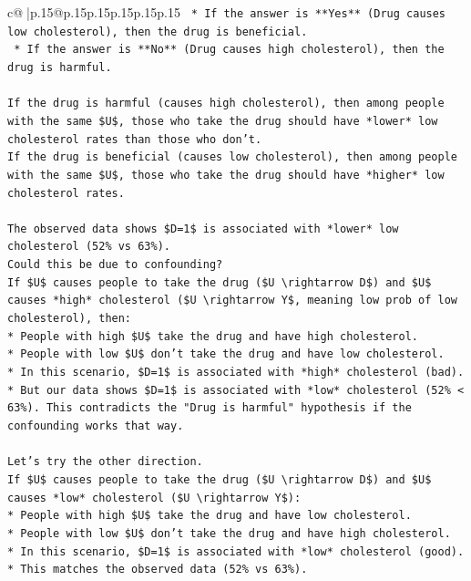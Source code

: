 \documentclass{article}
\begin{document}
{\begin{supertabular}{c@{$\;$}|p{.15\linewidth}@{}p{.15\linewidth}p{.15\linewidth}p{.15\linewidth}p{.15\linewidth}p{.15\linewidth}}
{{{\texttt{    *   If the answer is **Yes** (Drug causes low cholesterol), then the drug is beneficial.} \\
\texttt{    *   If the answer is **No** (Drug causes high cholesterol), then the drug is harmful.} \\
\\ 
\texttt{If the drug is harmful (causes high cholesterol), then among people with the same \$U\$, those who take the drug should have *lower* low cholesterol rates than those who don't.} \\
\texttt{If the drug is beneficial (causes low cholesterol), then among people with the same \$U\$, those who take the drug should have *higher* low cholesterol rates.} \\
\\ 
\texttt{The observed data shows \$D=1\$ is associated with *lower* low cholesterol (52\% vs 63\%).} \\
\texttt{Could this be due to confounding?} \\
\texttt{If \$U\$ causes people to take the drug (\$U \textbackslash{}rightarrow D\$) and \$U\$ causes *high* cholesterol (\$U \textbackslash{}rightarrow Y\$, meaning low prob of low cholesterol), then:} \\
\texttt{*   People with high \$U\$ take the drug and have high cholesterol.} \\
\texttt{*   People with low \$U\$ don't take the drug and have low cholesterol.} \\
\texttt{*   In this scenario, \$D=1\$ is associated with *high* cholesterol (bad).} \\
\texttt{*   But our data shows \$D=1\$ is associated with *low* cholesterol (52\% < 63\%). This contradicts the "Drug is harmful" hypothesis if the confounding works that way.} \\
\\ 
\texttt{Let's try the other direction.} \\
\texttt{If \$U\$ causes people to take the drug (\$U \textbackslash{}rightarrow D\$) and \$U\$ causes *low* cholesterol (\$U \textbackslash{}rightarrow Y\$):} \\
\texttt{*   People with high \$U\$ take the drug and have low cholesterol.} \\
\texttt{*   People with low \$U\$ don't take the drug and have high cholesterol.} \\
\texttt{*   In this scenario, \$D=1\$ is associated with *low* cholesterol (good).} \\
\texttt{*   This matches the observed data (52\% vs 63\%).} \\
}}}
\end{supertabular}}
\end{document}
